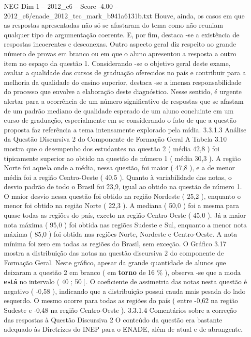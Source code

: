 \begin{textsample}{NEG Dim 1 – 2012\_c6 – Score -4.00 – 2012\_c6/enade\_2012\_tec\_mark\_b941a6131b.txt}
Houve, ainda, os casos em que as respostas apresentadas não só se afastaram do tema como não reuniam qualquer tipo de argumentação coerente.
E, por fim, destaca -se a existência de respostas incoerentes e desconexas.
Outro aspecto geral diz respeito ao grande número de provas em branco ou em que o aluno apresentou a resposta a outro item no espaço da questão 1.
Considerando -se o objetivo geral deste exame, avaliar a qualidade dos cursos de graduação oferecidos no país e contribuir para a melhoria da qualidade do ensino superior, destaca -se a imensa responsabilidade do processo que envolve a elaboração deste diagnóstico.
Nesse sentido, é urgente alertar para a ocorrência de um número significativo de respostas que se afastam de um padrão mediano de qualidade esperado de um aluno concluinte em um curso de graduação, especialmente em se considerando o fato de que a questão proposta faz referência a tema intensamente explorado pela mídia. 3.3.1.3 Análise da Questão Discursiva 2 do Componente de Formação Geral A Tabela 3.10 mostra que o desempenho dos estudantes na questão 2 ( média 42,8 ) foi tipicamente superior ao obtido na questão de número 1 ( média 30,3 ).
A região Norte foi aquela onde a média, nessa questão, foi maior ( 47,8 ), e a de menor média foi a região Centro-Oeste ( 40,5 ).
Quanto à variabilidade das notas, o desvio padrão de todo o Brasil foi 23,9, igual ao obtido na questão de número 1.
O maior desvio nessa questão foi obtido na região Nordeste ( 25,2 ), enquanto o menor foi obtido na região Norte ( 22,3 ).
A mediana ( 50,0 ) foi a mesma para quase todas as regiões do país, exceto na região Centro-Oeste ( 45,0 ).
Já a maior nota máxima ( 95,0 ) foi obtida nas regiões Sudeste e Sul, enquanto a menor nota máxima ( 85,0 ) foi obtida nas regiões Norte, Nordeste e Centro-Oeste.
A nota mínima foi zero em todas as regiões do Brasil, sem exceção.
O Gráfico 3.17 mostra a distribuição das notas na questão discursiva 2 do componente de Formação Geral.
Neste gráfico, apesar da grande quantidade de alunos que deixaram a questão 2 em branco ( em \textbf{torno} de 16 \% ), observa -se que a moda \textbf{está} no intervalo ( 40 ; 50 ].
O coeficiente de assimetria das notas nesta questão é negativo ( -0,58 ), indicando que a distribuição possui cauda mais pesada do lado esquerdo.
O mesmo ocorre para todas as regiões do país ( entre -0,62 na região Sudeste e -0,48 na região Centro-Oeste ). 3.3.1.4 Comentários sobre a correção das respostas à Questão Discursiva 2 O conteúdo da questão era bastante adequado às Diretrizes do INEP para o ENADE, além de atual e de abrangente.

\end{textsample}
